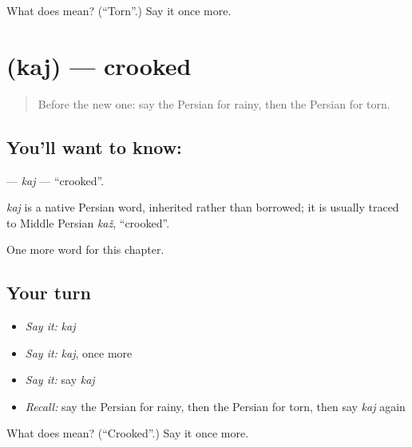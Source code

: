 \begin{tcolorbox}[breakable,colback=teal!4,colframe=teal!35!black,title={Before you move on}]
What does  mean? (\textquotedblleft{}Torn\textquotedblright{}.) Say it once more.
\end{tcolorbox}
\section[\texorpdfstring{\fa{کج} (kaj)}{کج (kaj)}]{ (kaj) — crooked}

\label{lesson:FA-C202-kaj}



\begin{quote}
Before the new one: say the Persian for rainy, then the Persian for torn.
\end{quote}

\subsection*{You'll want to know: }
\textbf{} — \emph{kaj} — \textquotedblleft{}crooked\textquotedblright{}.

\begin{cousinweb}
\emph{kaj} is a native Persian word, inherited rather than borrowed; it is usually traced to Middle Persian \emph{kaž}, \textquotedblleft{}crooked\textquotedblright{}.
\end{cousinweb}

\begin{grammarlens}[title={What you've built}]
One more word for this chapter.
\end{grammarlens}

\subsection*{Your turn}
\begin{itemize}
\raggedright
  \item \emph{Say it:} \emph{kaj}
  \item \emph{Say it:} \emph{kaj}, once more
  \item \emph{Say it:} say \emph{kaj}
  \item \emph{Recall:} say the Persian for rainy, then the Persian for torn, then say \emph{kaj} again
\end{itemize}

\begin{tcolorbox}[breakable,colback=teal!4,colframe=teal!35!black,title={Before you move on}]
What does  mean? (\textquotedblleft{}Crooked\textquotedblright{}.) Say it once more.
\end{tcolorbox}
